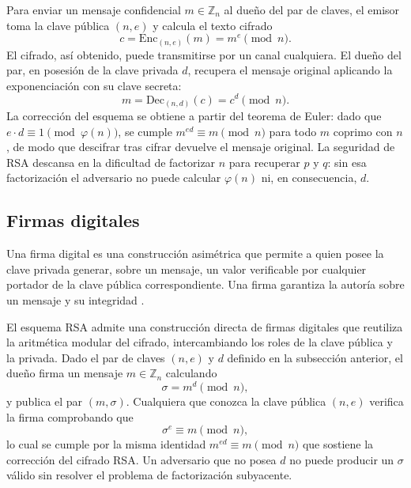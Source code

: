 Para enviar un mensaje confidencial $m \in \mathbb{Z}_n$ al dueño del par de claves, el emisor toma la clave pública $(n, e)$ y calcula el texto cifrado
\begin{equation}
    c = \text{Enc}_{(n,e)}(m) = m^e \pmod{n}.
\end{equation}
El cifrado, así obtenido, puede transmitirse por un canal cualquiera. El dueño del par, en posesión de la clave privada $d$, recupera el mensaje original aplicando la exponenciación con su clave secreta:
\begin{equation}
    m = \text{Dec}_{(n,d)}(c) = c^d \pmod{n}.
\end{equation}
La corrección del esquema se obtiene a partir del teorema de Euler: dado que $e \cdot d \equiv 1 \pmod{\varphi(n)}$, se cumple $m^{ed} \equiv m \pmod{n}$ para todo $m$ coprimo con $n$, de modo que descifrar tras cifrar devuelve el mensaje original. La seguridad de RSA descansa en la dificultad de factorizar $n$ para recuperar $p$ y $q$: sin esa factorización el adversario no puede calcular $\varphi(n)$ ni, en consecuencia, $d$.

\subsection{Firmas digitales}

Una firma digital es una construcción asimétrica que permite a quien posee la clave privada generar, sobre un mensaje, un valor verificable por cualquier portador de la clave pública correspondiente. Una firma garantiza la autoría sobre un mensaje y su integridad \cite{KatzLindell}.

El esquema RSA admite una construcción directa de firmas digitales que reutiliza la aritmética modular del cifrado, intercambiando los roles de la clave pública y la privada. Dado el par de claves $(n, e)$ y $d$ definido en la subsección anterior, el dueño firma un mensaje $m \in \mathbb{Z}_n$ calculando
\begin{equation}
    \sigma = m^d \pmod{n},
\end{equation}
y publica el par $(m, \sigma)$. Cualquiera que conozca la clave pública $(n, e)$ verifica la firma comprobando que
\begin{equation}
    \sigma^e \equiv m \pmod{n},
\end{equation}
lo cual se cumple por la misma identidad $m^{ed} \equiv m \pmod n$ que sostiene la corrección del cifrado RSA. Un adversario que no posea $d$ no puede producir un $\sigma$ válido sin resolver el problema de factorización subyacente.

